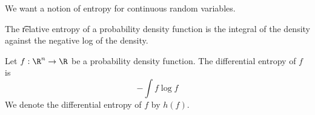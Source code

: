 

We want a notion of entropy
for continuous random variables.


The \t{relative entropy} of a probability density function is the integral of the density against the negative log of the density.


Let $f: \R^n \to \R$ be a probability density function.
The differential entropy of $f$ is
\[
  - \int f \log f
\]
We denote the differential entropy of $f$ by $h(f)$.

\blankpage
